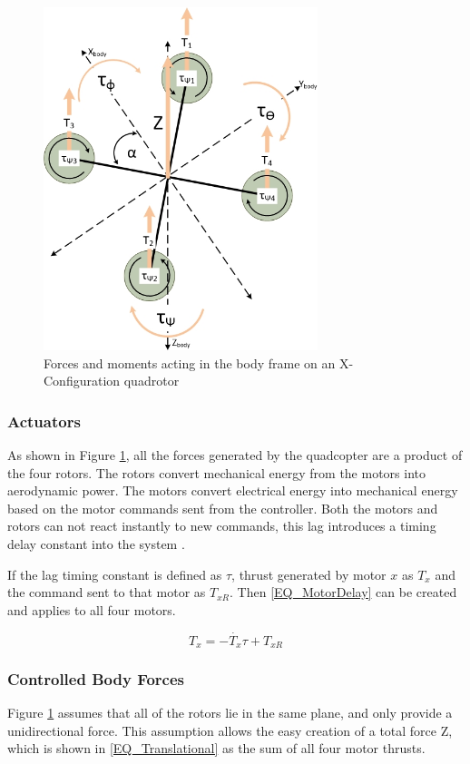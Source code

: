 	\begin{figure}[H]
		\centering
		\includegraphics[height = 10cm]{Images/Literature/quadforces.jpg}     
		\caption{Forces and moments acting in the body frame on an X-Configuration quadrotor}
		\label{IM_Forces}
	\end{figure}
	
	
		\subsubsection{Actuators}
		As shown in Figure \ref{IM_Forces}, all the forces generated by the quadcopter are a product of the four rotors. The rotors convert mechanical energy from the motors into aerodynamic power. The motors convert electrical energy into mechanical energy based on the motor commands sent from the controller. Both the motors and rotors can not react instantly to new commands, this lag introduces a timing delay constant into the system \cite{Moller2015}.
		
		If the lag timing constant is defined as $\tau$, thrust generated by motor $x$ as $T_x$ and the command sent to that motor as $T_{xR}$. Then \eqref{EQ_MotorDelay} can be created and applies to all four motors.
		
		\begin{equation}
		T_x = -\dot{T_x} \tau + T_{xR}
		\label{EQ_MotorDelay}
		\end{equation}
		 		
		\subsubsection{Controlled Body Forces}
		Figure \ref{IM_Forces} assumes that all of the rotors lie in the same plane, and only provide a unidirectional force. This assumption allows the easy creation of a total force Z, which is shown in \eqref{EQ_Translational} as the sum of all four motor thrusts. 
		
